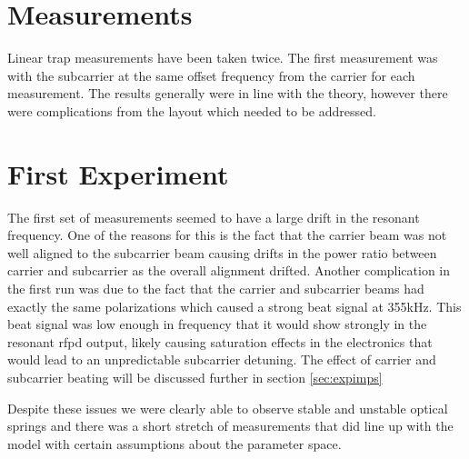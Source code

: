 \section{Measurements}

Linear trap measurements have been taken twice.
The first measurement was with the subcarrier at the same offset frequency from
the carrier for each measurement.
The results generally were in line with the theory, however there were
complications from the layout which needed to be addressed.

\section{First Experiment}


The first set of measurements seemed to have a large drift in the resonant
frequency.
One of the reasons for this is the fact that the carrier beam was not
well aligned to the subcarrier beam causing drifts in the power ratio between
carrier and subcarrier as the overall alignment drifted.
Another complication in the first run was due to the fact that the carrier and
subcarrier beams had exactly the same polarizations which caused a strong
beat signal at 355kHz. This beat signal was low enough in frequency that
it would show strongly in the resonant \ac{rfpd} output, likely causing
saturation effects in the electronics that would lead to an unpredictable
subcarrier detuning.
The effect of carrier and subcarrier beating will be discussed further in
section \ref{sec:expimps}

Despite these issues we were clearly able to observe
stable and unstable optical springs and there was a short stretch of
measurements that did line up with the model with certain assumptions
about the parameter space.


